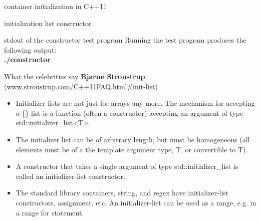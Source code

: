 \documentclass[11pt]{beamer}
\begin{document}
\begin{frame}{container initialization in C++11}

\end{frame}

\begin{frame}{initialization list constructor}

\end{frame}

\begin{frame}{stdout of the constructor test program}
Running the test program produces the following output:
\\[0.4cm]
\textbf{./constructor}

\end{frame}

\begin{frame}{What the celebrities say}
\textbf{Bjarne Stroustrup} (\href{http://www.stroustrup.com/C++11FAQ.html\#init-list}{www.stroustrup.com/C++11FAQ.html\#init-list})
\begin{itemize}
\item Initializer lists are not just for arrays any more. The mechanism for accepting a \{\}-list is a function (often a constructor) accepting an argument of type std::initializer\_list\textless T\textgreater .\\
\pause
\item The initializer list can be of arbitrary length, but must be homogeneous (all elements must be of a the template argument type, T, or convertible to T).\\
\pause
\item A constructor that takes a single argument of type std::initializer\_list is called an initializer-list constructor.\\
\pause
\item The standard library containers, string, and regex have initializer-list constructors, assignment, etc. An initializer-list can be used as a range, e.g. in a range for statement.
\end{itemize}
\end{frame}
\end{document}
